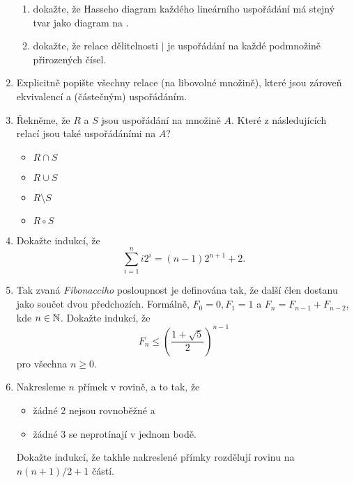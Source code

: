 \begin{enumerate}
\begin{enumerate}
   \item dokažte, že Hasseho diagram každého lineárního uspořádání má stejný
    tvar jako diagram na .
   \item dokažte, že relace dělitelnosti $ \mid $ je uspořádání na každé
    podmnožině přirozených čísel.
  \end{enumerate}
 \item Explicitně popište všechny relace (na libovolné množině), které jsou
  zároveň ekvivalencí a (částečným) uspořádáním.
 \item Řekněme, že $R$ a $S$ jsou uspořádání na množině $A$. Které z
  následujících relací jsou také uspořádáními na $A$?
  \begin{itemize}[itemsep=0pt]
  \item $R \cap S$ 
  \item $R \cup S$ 
  \item $R \setminus S$
  \item $R \circ S$
 \end{itemize}
 \item Dokažte indukcí, že
  \[
   \sum_{i=1}^{n} i 2^{i} = (n - 1)2^{n+1} + 2.
  \]
 \item Tak zvaná \emph{Fibonacciho} posloupnost je definována tak, že další člen
  dostanu jako součet dvou předchozích. Formálně, $F_0 = 0, F_1 = 1$ a $F_n =
  F_{n - 1} + F_{n - 2}$, kde $n \in \mathbb{N}$. Dokažte indukcí, že
  \[
   F_n \leq \left( \frac{1+\sqrt{5}}{2} \right) ^{n-1}
  \]
  pro všechna $n \geq 0$.
 \item Nakresleme $n$ přímek v rovině, a to tak, že
  \begin{itemize}
   \item žádné 2 nejsou rovnoběžné a
   \item žádné 3 se neprotínají v jednom bodě.
  \end{itemize}
  Dokažte indukcí, že takhle nakreslené přímky rozdělují rovinu na $n(n+1) / 2 +
  1$ částí.
\end{enumerate}

